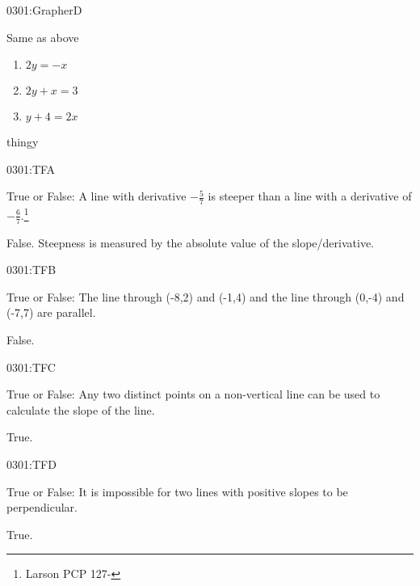 \begin{defproblem}{0301:GrapherD}%
\begin{onlyproblem}%
\begin{exercise}
Same as above
\begin{enumerate}
\item $2y=-x$
\item $2y+x=3$
\item $y+4=2x$
\end{enumerate}
\end{exercise}
\end{onlyproblem}
\begin{onlysolution}
thingy
\end{onlysolution}
\end{defproblem}

\begin{defproblem}{0301:TFA}%
\begin{onlyproblem}%
\begin{exercise}
True or False: A line with derivative $-\frac{5}{7}$ is steeper than a line with a derivative of $-\frac{6}{7}$.\footnote{Larson PCP 127-}
\end{exercise}
\end{onlyproblem}
\begin{onlysolution}
False.  Steepness is measured by the absolute value of the slope/derivative.
\end{onlysolution}
\end{defproblem}

\begin{defproblem}{0301:TFB}%
\begin{onlyproblem}%
\begin{exercise}
True or False: The line through (-8,2) and (-1,4) and the line through (0,-4) and (-7,7) are parallel.
\end{exercise}
\end{onlyproblem}
\begin{onlysolution}
False.
\end{onlysolution}
\end{defproblem}

\begin{defproblem}{0301:TFC}%
\begin{onlyproblem}%
\begin{exercise}
True or False: Any two distinct points on a non-vertical line can be used to calculate the slope of the line.
\end{exercise}
\end{onlyproblem}
\begin{onlysolution}
True.
\end{onlysolution}
\end{defproblem}

\begin{defproblem}{0301:TFD}%
\begin{onlyproblem}%
\begin{exercise}
True or False: It is impossible for two lines with positive slopes to be perpendicular.
\end{exercise}
\end{onlyproblem}
\begin{onlysolution}
True.
\end{onlysolution}
\end{defproblem}


\endinput

